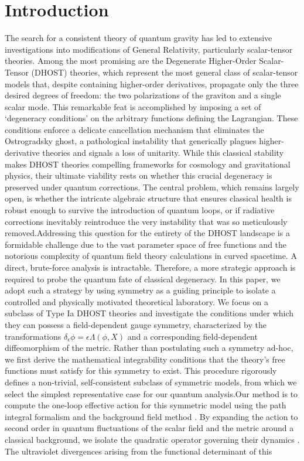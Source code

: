 \documentclass[twocolumn]{aastex631}
\begin{document}
\section{Introduction}
\label{sec:intro}
The search for a consistent theory of quantum gravity has led to extensive investigations into modifications of General Relativity, particularly scalar-tensor theories. Among the most promising are the Degenerate Higher-Order Scalar-Tensor (DHOST) theories, which represent the most general class of scalar-tensor models that, despite containing higher-order derivatives, propagate only the three desired degrees of freedom: the two polarizations of the graviton and a single scalar mode. This remarkable feat is accomplished by imposing a set of `degeneracy conditions' on the arbitrary functions defining the Lagrangian. These conditions enforce a delicate cancellation mechanism that eliminates the Ostrogradsky ghost, a pathological instability that generically plagues higher-derivative theories and signals a loss of unitarity. While this classical stability makes DHOST theories compelling frameworks for cosmology and gravitational physics, their ultimate viability rests on whether this crucial degeneracy is preserved under quantum corrections. The central problem, which remains largely open, is whether the intricate algebraic structure that ensures classical health is robust enough to survive the introduction of quantum loops, or if radiative corrections inevitably reintroduce the very instability that was so meticulously removed.Addressing this question for the entirety of the DHOST landscape is a formidable challenge due to the vast parameter space of free functions and the notorious complexity of quantum field theory calculations in curved spacetime. A direct, brute-force analysis is intractable. Therefore, a more strategic approach is required to probe the quantum fate of classical degeneracy. In this paper, we adopt such a strategy by using symmetry as a guiding principle to isolate a controlled and physically motivated theoretical laboratory. We focus on a subclass of Type Ia DHOST theories and investigate the conditions under which they can possess a field-dependent gauge symmetry, characterized by the transformations $\delta_\epsilon \phi = \epsilon \Lambda(\phi, X)$ and a corresponding field-dependent diffeomorphism of the metric. Rather than postulating such a symmetry ad-hoc, we first derive the mathematical integrability conditions that the theory's free functions must satisfy for this symmetry to exist. This procedure rigorously defines a non-trivial, self-consistent subclass of symmetric models, from which we select the simplest representative case for our quantum analysis.Our method is to compute the one-loop effective action for this symmetric model using the path integral formalism and the background field method \citep{ferrero2025oneloopeffectiveactioncoherent,ferrero2025oneloopeffectiveactioncoherent}. By expanding the action to second order in quantum fluctuations of the scalar field and the metric around a classical background, we isolate the quadratic operator governing their dynamics \citep{ferrero2025oneloopeffectiveactioncoherent}. The ultraviolet divergences arising from the functional determinant of this 
\end{document}
